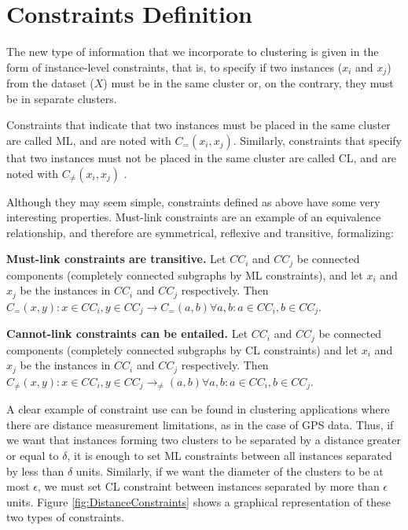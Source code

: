 \section{Constraints Definition}

The new type of information that we incorporate to clustering is given in the form of instance-level constraints, that is, to specify if two instances ($x_i$ and $x_j$) from the dataset ($X$) must be in the same cluster or, on the contrary, they must be in separate clusters.

Constraints that indicate that two instances must be placed in the same cluster are called \acf{ML}, and are noted with $C_=(x_i,x_j)$. Similarly, constraints that specify that two instances must not be placed in the same cluster are called \acf{CL}, and are noted with $C_{\neq}(x_i,x_j)$ \cite{wagstaff2000clustering}.

Although they may seem simple, constraints defined as above have some very interesting properties. Must-link constraints are an example of an equivalence relationship, and therefore are symmetrical, reflexive and transitive, formalizing:

\begin{observation}
	\textbf{Must-link constraints are transitive.} Let $CC_i$ and $CC_j$ be connected components (completely connected subgraphs by \acs{ML} constraints), and let $x_i$ and $x_j$ be the instances in $CC_i$ and $CC_j$ respectively. Then $C_=(x,y): x \in CC_i, y \in CC_j \rightarrow C_=(a,b) \forall a,b: a\in CC_i, b \in CC_j$. \cite{davidson2007survey}
\end{observation}

\begin{observation}
	\textbf{Cannot-link constraints can be entailed.} Let $CC_i$ and $CC_j$ be connected components (completely connected subgraphs by \acs{CL} constraints) and let $x_i$ and $x_j$ be the instances in $CC_i$ and $CC_j$ respectively. Then $C_{\neq}(x,y): x \in CC_i, y \in CC_j \rightarrow _{\neq}(a,b) \forall a,b: a\in CC_i, b \in CC_j$. \cite{davidson2007survey}
\end{observation}

A clear example of constraint use can be found in clustering applications where there are distance measurement limitations, as in the case of GPS data. Thus, if we want that instances forming two clusters to be separated by a distance greater or equal to $\delta$, it is enough to set \acs{ML} constraints between all instances separated by less than $\delta$ units. Similarly, if we want the diameter of the clusters to be at most $\epsilon$, we must set \acs{CL} constraint between instances separated by more than $\epsilon$ units. Figure \ref{fig:DistanceConstraints} shows a graphical representation of these two types of constraints.

